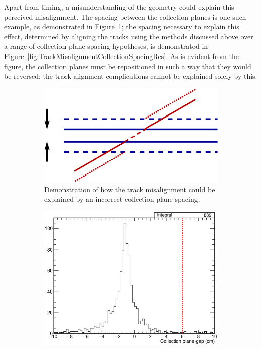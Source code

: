 Apart from timing, a misunderstanding of the geometry could explain this perceived misalignment.  The spacing between the collection planes is one such example, as demonstrated in Figure~\ref{fig:TrackMisalignmentCollectionSpacingGeo}; the spacing necessary to explain this effect, determined by aligning the tracks using the methods discussed above over a range of collection plane spacing hypotheses, is demonstrated in Figure~\ref{fig:TrackMisalignmentCollectionSpacingRes}.  As is evident from the figure, the collection planes must be repositioned in such a way that they would be reversed; the track alignment complications cannot be explained solely by this.

\begin{figure}
  \centering
  \begin{subfigure}[t]{0.48\linewidth}
    \centering
    \includegraphics[width=\textwidth]{misalign_track_collection_geo.eps}
    \caption{Demonstration of how the track misalignment could be explained by an incorrect collection plane spacing.}
    \label{fig:TrackMisalignmentCollectionSpacingGeo}
  \end{subfigure}
  \hfill
  \begin{subfigure}[t]{0.48\linewidth}
    \centering
    \includegraphics[width=\textwidth]{misalign_track_collection_res.eps}

\end{subfigure}
\end{figure}
